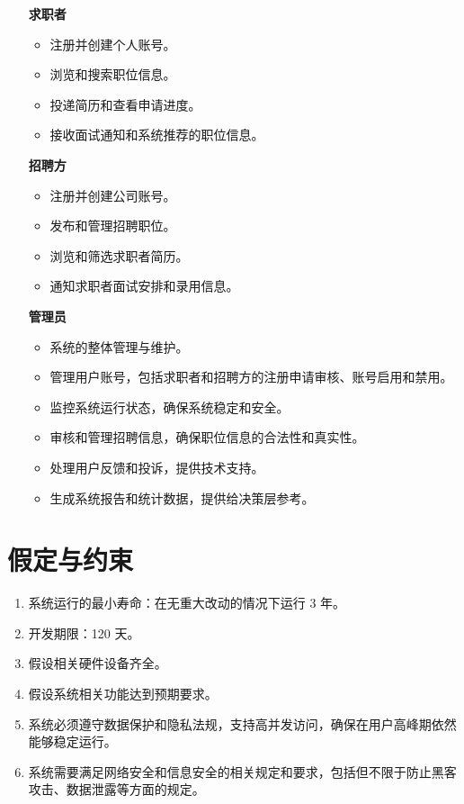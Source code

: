 \documentclass[UTF8,a4paper,10pt]{ctexart}
\begin{document}
\begin{itemize}
    \item [\textbf{求职者}]
    \begin{itemize}
        \item 注册并创建个人账号。
        \item 浏览和搜索职位信息。
        \item 投递简历和查看申请进度。
        \item 接收面试通知和系统推荐的职位信息。
    \end{itemize}
    \item [\textbf{招聘方}] 
    \begin{itemize}
        \item 注册并创建公司账号。
        \item 发布和管理招聘职位。
        \item 浏览和筛选求职者简历。
        \item 通知求职者面试安排和录用信息。
    \end{itemize}
    \item [\textbf{管理员}]  
    \begin{itemize}
        \item 系统的整体管理与维护。
        \item 管理用户账号，包括求职者和招聘方的注册申请审核、账号启用和禁用。
        \item 监控系统运行状态，确保系统稳定和安全。
        \item 审核和管理招聘信息，确保职位信息的合法性和真实性。
        \item 处理用户反馈和投诉，提供技术支持。
        \item 生成系统报告和统计数据，提供给决策层参考。
    \end{itemize}
\end{itemize}

\section{假定与约束}

\begin{enumerate}
    \item 系统运行的最小寿命：在无重大改动的情况下运行 3 年。
    \item 开发期限：120 天。
    \item 假设相关硬件设备齐全。
    \item 假设系统相关功能达到预期要求。
    \item 系统必须遵守数据保护和隐私法规，支持高并发访问，确保在用户高峰期依然能够稳定运行。
    \item 系统需要满足网络安全和信息安全的相关规定和要求，包括但不限于防止黑客攻击、数据泄露等方面的规定。
\end{enumerate}
\end{document}
